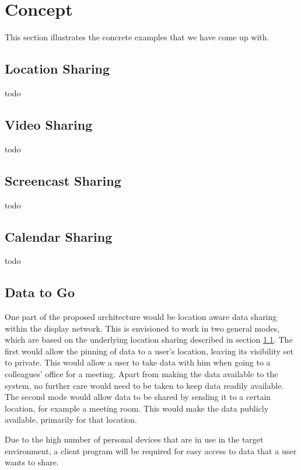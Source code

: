 \section{Concept}

This section illustrates the concrete examples that we have come up with.

\subsection{Location Sharing}
\label{location_sharing}

todo

\subsection{Video Sharing}

todo

\subsection{Screencast Sharing}

todo

\subsection{Calendar Sharing}

todo

\subsection{Data to Go}
\label{data2go}

One part of the proposed architecture would be location aware data sharing within the display network.
This is envisioned to work in two general modes, which are based on the underlying location sharing described in section \ref{location_sharing}.
The first would allow the pinning of data to a user's location, leaving its visibility set to private.
This would allow a user to take data with him when going to a colleagues' office for a meeting.
Apart from making the data available to the system, no further care would need to be taken to keep data readily available.
The second mode would allow data to be shared by sending it to a certain location, for example a meeting room.
This would make the data publicly available, primarily for that location.

Due to the high number of personal devices that are in use in the target environment, a client program will be required for easy access to data that a user wants to share.


